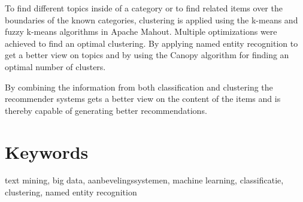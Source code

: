 {To find different topics inside of a category or to find related items over the boundaries of the known categories, clustering is applied using the k-means and fuzzy k-means algorithms in Apache Mahout. Multiple optimizations were achieved to find an optimal clustering. By applying named entity recognition to get a better view on topics and by using the Canopy algorithm for finding an optimal number of clusters.

By combining the information from both classification and clustering the recommender systems gets a better view on the content of the items and is thereby capable of generating better recommendations.
\section*{Keywords}

text mining, big data, aanbevelingssystemen, machine learning, classificatie, clustering, named entity recognition

}

\newpage %
